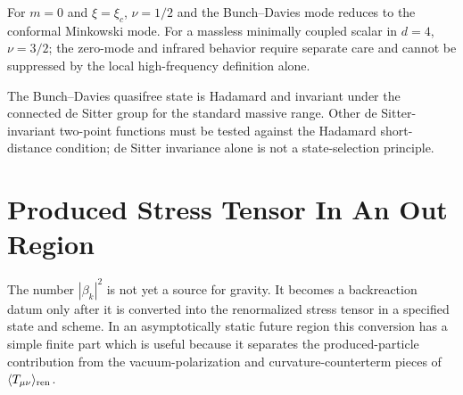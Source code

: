 For \(m=0\) and \(\xi=\xi_c\), \(\nu=1/2\) and the Bunch--Davies mode reduces
to the conformal Minkowski mode.  For a massless minimally coupled scalar in
\(d=4\), \(\nu=3/2\); the zero-mode and infrared behavior require separate
care and cannot be suppressed by the local high-frequency definition alone.

The Bunch--Davies quasifree state is Hadamard and invariant under the
connected de Sitter group for the standard massive range.  Other
de Sitter-invariant two-point functions must be tested against the Hadamard
short-distance condition; de Sitter invariance alone is not a state-selection
principle.

\section{Produced Stress Tensor In An Out Region}

The number \(|\beta_k|^2\) is not yet a source for gravity.  It becomes a
backreaction datum only after it is converted into the renormalized stress
tensor in a specified state and scheme.  In an asymptotically static future
region this conversion has a simple finite part which is useful because it
separates the produced-particle contribution from the vacuum-polarization and
curvature-counterterm pieces of \(\langle T_{\mu\nu}\rangle_{\rm ren}\).

